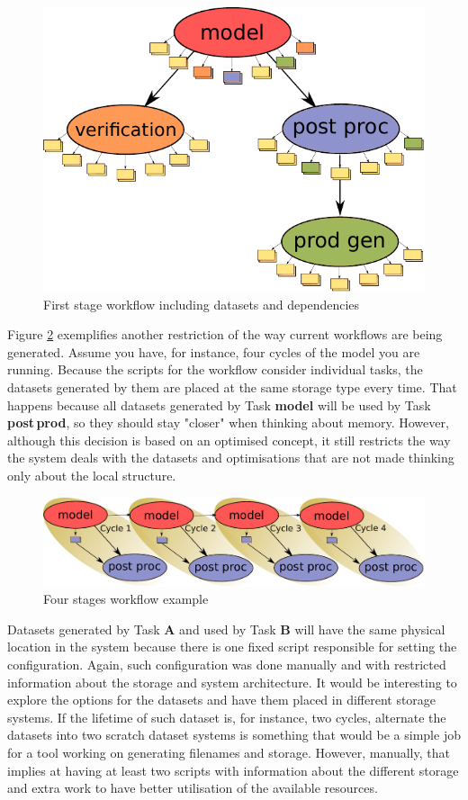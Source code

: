 \documentclass[a4paper]{article}
\begin{document}
{{{{\begin{figure}[H]
  \centering
  \includegraphics[width=0.6\columnwidth]{cycle-io-dep}
  \caption{First stage workflow including datasets and dependencies}
  \label{fig:cycle-io-dep}
\end{figure}

Figure \ref{fig:cycle-4} exemplifies another restriction of the way current workflows are being generated. Assume you have, for instance, four cycles of the model you are running. Because the scripts for the workflow consider individual tasks, the datasets generated by them are placed at the same storage type every time. That happens because all datasets generated by Task \textbf{model} will be used by Task \textbf{post\,prod}, so they should stay "closer" when thinking about memory. However, although this decision is based on an optimised concept, it still restricts the way the system deals with the datasets and optimisations that are not made thinking only about the local structure.

\begin{figure}[H]
  \centering
  \includegraphics[width=0.8\columnwidth]{cycle-4}
  \caption{Four stages workflow example}
  \label{fig:cycle-4}
\end{figure}

Datasets generated by Task \textbf{A} and used by Task \textbf{B} will have the same physical location in the system because there is one fixed script responsible for setting the configuration. Again, such configuration was done manually and with restricted information about the storage and system architecture. It would be interesting to explore the options for the datasets and have them placed in different storage systems. If the lifetime of such dataset is, for instance, two cycles, alternate the datasets into two scratch dataset systems is something that would be a simple job for a tool working on generating filenames and storage. However, manually, that implies at having at least two scripts with information about the different storage and extra work to have better utilisation of the available resources.

}}}}
\end{document}
